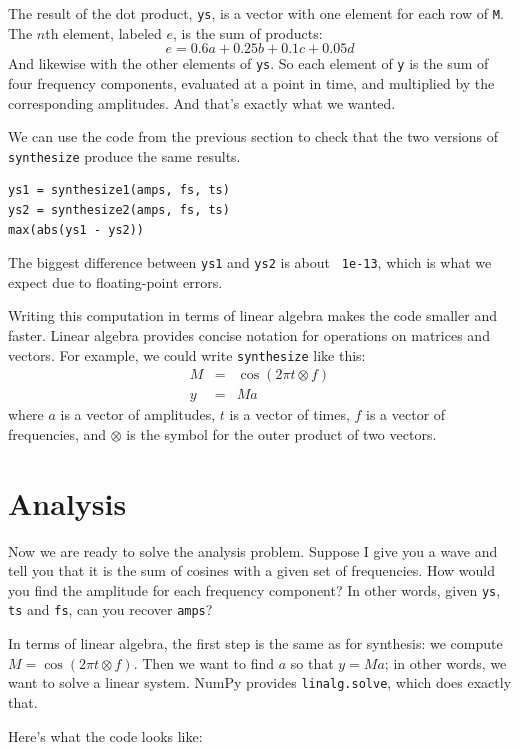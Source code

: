 \documentclass[12pt]{book}
\begin{document}
The result of the dot product, {\tt ys}, is a vector with one element
for each row of {\tt M}.  The $n$th element, labeled $e$, is the sum
of products:
%
\[ e = 0.6 a + 0.25 b + 0.1 c + 0.05 d \]
%
And likewise with the other elements of {\tt ys}.  So each element
of {\tt y} is the sum of four frequency components, evaluated at
a point in time, and multiplied by the corresponding amplitudes.
And that's exactly what we wanted.

We can use the code from the previous section to check that the two
versions of {\tt synthesize} produce the same results.

\begin{verbatim}
ys1 = synthesize1(amps, fs, ts)
ys2 = synthesize2(amps, fs, ts)
max(abs(ys1 - ys2))
\end{verbatim}

The biggest difference between {\tt ys1} and {\tt ys2} is about {\tt
  1e-13}, which is what we expect due to floating-point errors.

Writing this computation in terms of linear algebra makes the code
smaller and faster.  Linear algebra
provides concise notation for operations on matrices and vectors.  For
example, we could write {\tt synthesize} like this:
%
\begin{eqnarray*}
M &=& \cos (2 \pi t \otimes f) \\
y &=& M a
\end{eqnarray*}
%
where $a$ is a vector of amplitudes,
$t$ is a vector of times, $f$ is a vector of frequencies, and
$\otimes$ is the symbol for the outer product of two vectors.


\section{Analysis}
\label{analysis}

Now we are ready to solve the analysis problem.  Suppose I give you
a wave and tell you that it is the sum of cosines with a given set
of frequencies.  How would you find the amplitude for each frequency
component?  In other words, given {\tt ys}, {\tt ts} and {\tt fs},
can you recover {\tt amps}?

In terms of linear algebra, the first step is the same as for
synthesis: we compute $M = \cos (2 \pi t \otimes f)$.  Then we want
to find $a$ so that $y = M a$; in other words, we want to solve a
linear system.  NumPy provides {\tt linalg.solve}, which does
exactly that.

Here's what the code looks like:
\end{document}
